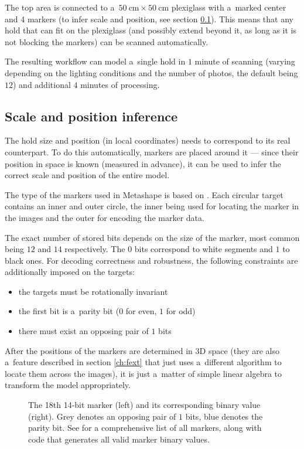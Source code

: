 The top area is connected to a~$\SI{50}{\centi\meter} \times \SI{50}{\centi\meter}$ plexiglass with a~marked center and 4 markers (to infer scale and position, see section \ref{sec:markersss}). This means that any hold that can fit on the plexiglass (and possibly extend beyond it, as long as it is not blocking the markers) can be scanned automatically.

The resulting workflow can model a~single hold in $1$ minute of scanning (varying depending on the lighting conditions and the number of photos, the default being $12$) and additional $4$ minutes of processing.

\subsection{Scale and position inference}\label{sec:markersss}
The hold size and position (in local coordinates) needs to correspond to its real counterpart.
To do this automatically, markers are placed around it --- since their position in space is known (measured in advance), it can be used to infer the correct scale and position of the entire model.

The type of the markers used in Metashape is based on \citet{schneider19913,borisPatent}.
Each circular target contains an inner and outer circle, the inner being used for locating the marker in the images and the outer for encoding the marker data.

The exact number of stored bits depends on the size of the marker, most common being $12$ and $14$ respectively.
The $0$ bits correspond to white segments and $1$ to black ones.
For decoding correctness and robustness, the following constraints are additionally imposed on the targets:

\begin{itemize}
	\item the targets must be rotationally invariant
	\item the first bit is a~parity bit ($0$ for even, $1$ for odd)
	\item there must exist an opposing pair of $1$ bits
\end{itemize}

After the positions of the markers are determined in 3D space (they are also a~feature described in section \ref{ch:fext} that just uses a~different algorithm to locate them across the images), it is just a~matter of simple linear algebra to transform the model appropriately.

\begin{figure}[t]
	\centering
	
	\caption{The 18th 14-bit marker (left) and its corresponding binary value (right). Grey denotes an opposing pair of $1$ bits, blue denotes the parity bit. See \citet{targetsPost} for a comprehensive list of all markers, along with code that generates all valid marker binary values.}
\end{figure}

